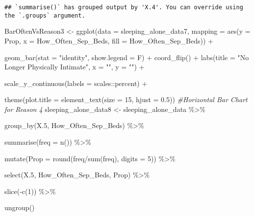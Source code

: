 \documentclass[
]{article}
\newenvironment{Shaded}{\begin{snugshade}}{\end{snugshade}}
\newcommand{\AttributeTok}[1]{\textcolor[rgb]{0.77,0.63,0.00}{#1}}
\newcommand{\CommentTok}[1]{\textcolor[rgb]{0.56,0.35,0.01}{\textit{#1}}}
\newcommand{\DecValTok}[1]{\textcolor[rgb]{0.00,0.00,0.81}{#1}}
\newcommand{\FloatTok}[1]{\textcolor[rgb]{0.00,0.00,0.81}{#1}}
\newcommand{\FunctionTok}[1]{\textcolor[rgb]{0.00,0.00,0.00}{#1}}
\newcommand{\NormalTok}[1]{#1}
\newcommand{\OtherTok}[1]{\textcolor[rgb]{0.56,0.35,0.01}{#1}}
\newcommand{\SpecialCharTok}[1]{\textcolor[rgb]{0.00,0.00,0.00}{#1}}
\newcommand{\StringTok}[1]{\textcolor[rgb]{0.31,0.60,0.02}{#1}}
\begin{document}
\begin{verbatim}
## `summarise()` has grouped output by 'X.4'. You can override using the `.groups` argument.
\end{verbatim}

\begin{Shaded}
\begin{Highlighting}[]
\NormalTok{BarOftenVsReason3 }\OtherTok{\textless{}{-}} \FunctionTok{ggplot}\NormalTok{(}\AttributeTok{data =}\NormalTok{ sleeping\_alone\_data7,}
                               \AttributeTok{mapping =} \FunctionTok{aes}\NormalTok{(}\AttributeTok{y =}\NormalTok{ Prop,}
                                             \AttributeTok{x =}\NormalTok{ How\_Often\_Sep\_Beds,}
                                             \AttributeTok{fill =}\NormalTok{ How\_Often\_Sep\_Beds)) }\SpecialCharTok{+}
  
  \FunctionTok{geom\_bar}\NormalTok{(}\AttributeTok{stat =} \StringTok{"identity"}\NormalTok{,}
           \AttributeTok{show.legend =}\NormalTok{ F) }\SpecialCharTok{+} 
  \FunctionTok{coord\_flip}\NormalTok{() }\SpecialCharTok{+} 
  \FunctionTok{labs}\NormalTok{(}\AttributeTok{title =} \StringTok{"No Longer Physically Intimate"}\NormalTok{,}
       \AttributeTok{x =} \StringTok{""}\NormalTok{,}
       \AttributeTok{y =} \StringTok{""}\NormalTok{) }\SpecialCharTok{+}
  
  \FunctionTok{scale\_y\_continuous}\NormalTok{(}\AttributeTok{labels =}\NormalTok{ scales}\SpecialCharTok{::}\NormalTok{percent) }\SpecialCharTok{+}
  
  \FunctionTok{theme}\NormalTok{(}\AttributeTok{plot.title =} \FunctionTok{element\_text}\NormalTok{(}\AttributeTok{size =} \DecValTok{15}\NormalTok{, }\AttributeTok{hjust =} \FloatTok{0.5}\NormalTok{))}
\CommentTok{\#Horizontal Bar Chart for Reason 4}
\NormalTok{sleeping\_alone\_data8 }\OtherTok{\textless{}{-}}\NormalTok{ sleeping\_alone\_data }\SpecialCharTok{\%\textgreater{}\%} 
  
  \FunctionTok{group\_by}\NormalTok{(X}\FloatTok{.5}\NormalTok{, How\_Often\_Sep\_Beds) }\SpecialCharTok{\%\textgreater{}\%} 
  
  \FunctionTok{summarise}\NormalTok{(}\AttributeTok{freq =} \FunctionTok{n}\NormalTok{()) }\SpecialCharTok{\%\textgreater{}\%} 
  
  \FunctionTok{mutate}\NormalTok{(}\AttributeTok{Prop =} \FunctionTok{round}\NormalTok{(freq}\SpecialCharTok{/}\FunctionTok{sum}\NormalTok{(freq), }\AttributeTok{digits =} \DecValTok{5}\NormalTok{)) }\SpecialCharTok{\%\textgreater{}\%} 
  
  \FunctionTok{select}\NormalTok{(X}\FloatTok{.5}\NormalTok{, How\_Often\_Sep\_Beds, Prop) }\SpecialCharTok{\%\textgreater{}\%} 
  
  \FunctionTok{slice}\NormalTok{(}\SpecialCharTok{{-}}\FunctionTok{c}\NormalTok{(}\DecValTok{1}\NormalTok{)) }\SpecialCharTok{\%\textgreater{}\%} 
  
  \FunctionTok{ungroup}\NormalTok{()}
\end{Highlighting}
\end{Shaded}
\end{document}
